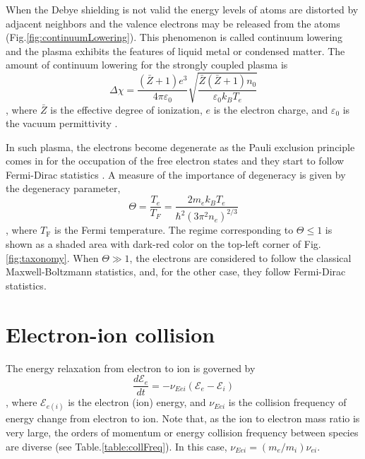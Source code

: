 When the Debye shielding is not valid the energy levels of atoms are distorted by adjacent neighbors and the valence electrons may be released from the atoms (Fig.\ref{fig:continuumLowering}). This phenomenon is called continuum lowering and the plasma exhibits the features of liquid metal or condensed matter. The amount of continuum lowering for the strongly coupled plasma is \cite{griem1962high, bataller2014blackbody}
\begin{equation}
\Delta \chi = \frac{(\bar{Z}+1) e^{3}}{4 \pi \varepsilon_{0}} \sqrt{\frac{\bar{Z}(\bar{Z}+1) n_{0}}{\varepsilon_{0} k_{B} T_{e}}}
\label{eq:lowering}
\end{equation}
, where $\bar{Z}$ is the effective degree of ionization, $e$ is the electron charge, and $\varepsilon_0$ is the vacuum permittivity \cite{bataller2014blackbody, griem1962high}.

In such plasma, the electrons become degenerate as the Pauli exclusion principle comes in for the occupation of the free electron states and they start to follow Fermi-Dirac statistics \cite{murillo2004strongly}. A measure of the importance of degeneracy is given by the degeneracy parameter,
\begin{equation}
\Theta=\frac{T_{e}}{T_{F}}=\frac{2 m_{e} k_{B} T_{e}}{\hbar^{2}\left(3 \pi^{2} n_{e}\right)^{2 / 3}}
\end{equation}
, where $T_\text{F}$ is the Fermi temperature.
The regime corresponding to $\Theta \leq 1$ is shown as a shaded area with dark-red color on the top-left corner of Fig.\ref{fig:taxonomy}. When $\Theta \gg 1$, the electrons are considered to follow the classical Maxwell-Boltzmann statistics, and, for the other case, they follow Fermi-Dirac statistics.



\section{Electron-ion collision}
\label{sec:ch3-2}

The energy relaxation from electron to ion is governed by
\begin{equation}
\frac{d \mathcal{E}_e}{d t}=-\nu_{Eei}\left(\mathcal{E}_{e}-\mathcal{E}_{i}\right)
\end{equation}
, where $\mathcal{E}_{e(i)}$ is the electron (ion) energy, and $\nu_{Eei}$ is the collision frequency of energy change from electron to ion. Note that, as the ion to electron mass ratio is very large, the orders of momentum or energy collision frequency between species are diverse (see Table.\ref{table:collFreq}). In this case, $\nu_{Eei} = \left( m_e/m_i \right) \nu_{ei}$.

